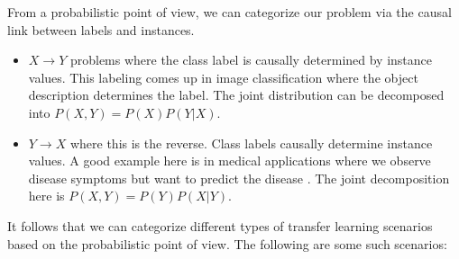 From a probabilistic point of view, we can categorize our problem via the causal link between labels and instances.

\begin{itemize}
	\item $X\to Y$ problems where the class label is causally determined by instance values. This labeling comes up in image classification where the object description determines the label. The joint distribution can be decomposed into $P(X,Y)=P(X)P(Y|X)$.
	\item $Y\to X$ where this is the reverse. Class labels causally determine instance values. A good example here is in medical applications where we observe disease symptoms but want to predict the disease \cite{Redko2017}. The joint decomposition here is $P(X,Y)=P(Y)P(X|Y)$.
\end{itemize}

It follows that we can categorize different types of transfer learning scenarios based on the probabilistic point of view. The following are some such scenarios:


